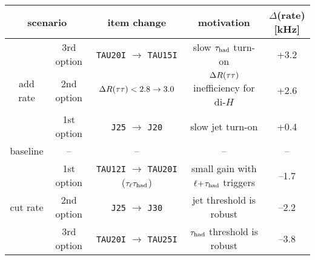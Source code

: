 \begin{tabular}{cc|c|c|c}
  \multicolumn{2}{c|}{scenario} & item change   & motivation                        & $\Delta$(rate) [kHz] \\
  \hline
           & 3rd option         & \texttt{TAU20I} $\rightarrow$ \texttt{TAU15I}               & slow $\tau_\text{had}$ turn-on                        &  +3.2 \\
  add rate & 2nd option         & \texttt{$\Delta R(\tau\tau) < 2.8 \rightarrow 3.0$}          & $\Delta R(\tau\tau)$ inefficiency for di-$H$ &  +2.6 \\
           & 1st option         & \texttt{J25} $\rightarrow$ \texttt{J20}                     & slow jet turn-on                            &  +0.4 \\
  baseline & --                 & --                                                          & --                                          & --    \\
           & 1st option         & \texttt{TAU12I} $\rightarrow$ \texttt{TAU20I} ($\tau_\ell\tau_\text{had}$) & small gain with $\ell\!+\!\tau_\text{had}$ triggers             & --1.7 \\
  cut rate & 2nd option         & \texttt{J25} $\rightarrow$ \texttt{J30}                     & jet threshold is robust                     & --2.2 \\
           & 3rd option         & \texttt{TAU20I} $\rightarrow$ \texttt{TAU25I}               & $\tau_\text{had}$ threshold is robust                 & --3.8 \\
\end{tabular}
